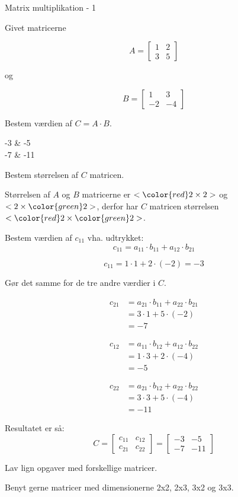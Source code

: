 \documentclass{article}
\begin{document}
\tableofcontents
\newpage

\begin{exercise}{Matrix multiplikation - 1}

Givet matricerne 

\[
A = \left[\begin{array}{rr}
1 & 2 \\ 
3 & 5 
\end{array} \right]
\]

og 

\[
B = \left[\begin{array}{rr}
1 & 3 \\ 
-2 & -4 
\end{array} \right]
\]

Bestem værdien af $C = A \cdot B$.

\begin{answermatrix}
-3 & -5  \\
-7 & -11 
\end{answermatrix}

\hint
Bestem størrelsen af $C$ matricen.

\hint
Størrelsen af $A$ og $B$ matricerne er $<{\color{red} 2} \times 2>$ og $<2 \times {\color{green}2}>$, 
derfor har $C$ matricen størrelsen $<{\color{red} 2} \times {\color{green}2}>$.

\hint
Bestem værdien af $c_{11}$ vha. udtrykket:
\[
c_{11} = a_{11} \cdot b_{11} + a_{12} \cdot b_{21}
\]

\hint
\[
c_{11} = 1 \cdot 1 + 2 \cdot (-2) = -3
\]

\hint
Gør det samme for de tre andre værdier i $C$.

\hint
\begin{align*}
c_{21} & = a_{21} \cdot b_{11} + a_{22} \cdot b_{21} \\
& = 3 \cdot 1 + 5 \cdot (-2) \\
& = -7
\end{align*}

\hint
\begin{align*}
c_{12} & = a_{11} \cdot b_{12} + a_{12} \cdot b_{22} \\
& = 1 \cdot 3 + 2 \cdot (-4) \\
& = -5
\end{align*}

\hint
\begin{align*}
c_{22} & = a_{21} \cdot b_{12} + a_{22} \cdot b_{22} \\
& = 3 \cdot 3 + 5 \cdot (-4) \\
& = -11
\end{align*}


\hint
Resultatet er så:
\[
C = \left[\begin{array}{rr}
c_{11} & c_{12} \\
c_{21} & c_{22} 
\end{array} \right] = 
\left[\begin{array}{rr}
-3 & -5 \\
-7 & -11 
\end{array} \right]
\]


\end{exercise}



\newpage

Lav lign opgaver med forskellige matricer.

Benyt gerne matricer med dimensionerne 2x2, 2x3, 3x2 og 3x3.
\end{document}
